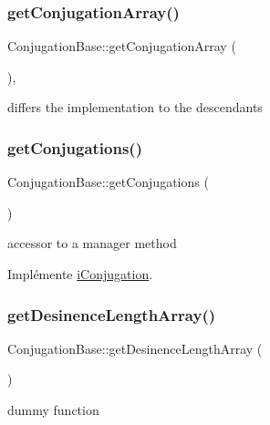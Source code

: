 \subsubsection{\texorpdfstring{get\+Conjugation\+Array()}{getConjugationArray()}}
{\footnotesize\ttfamily Conjugation\+Base\+::get\+Conjugation\+Array (\begin{DoxyParamCaption}{ }\end{DoxyParamCaption})\hspace{0.3cm}{\ttfamily [abstract]}, {\ttfamily [protected]}}

differs the implementation to the descendants \hypertarget{class_conjugation_base_ae5b10d1201dfc7ed1c56b1f5a073bbdb}{}\label{class_conjugation_base_ae5b10d1201dfc7ed1c56b1f5a073bbdb} 
\subsubsection{\texorpdfstring{get\+Conjugations()}{getConjugations()}}
{\footnotesize\ttfamily Conjugation\+Base\+::get\+Conjugations (\begin{DoxyParamCaption}{ }\end{DoxyParamCaption})}

accessor to a manager method 

Implémente \hyperlink{interfacei_conjugation_a6c0072d898eb8b2f3756c87dfed4af33}{i\+Conjugation}.

\hypertarget{class_conjugation_base_a9b0524f2dde45dcdc8f6c27d673c827a}{}\label{class_conjugation_base_a9b0524f2dde45dcdc8f6c27d673c827a} 
\subsubsection{\texorpdfstring{get\+Desinence\+Length\+Array()}{getDesinenceLengthArray()}}
{\footnotesize\ttfamily Conjugation\+Base\+::get\+Desinence\+Length\+Array (\begin{DoxyParamCaption}{ }\end{DoxyParamCaption})\hspace{0.3cm}{\ttfamily [protected]}}



dummy function 

